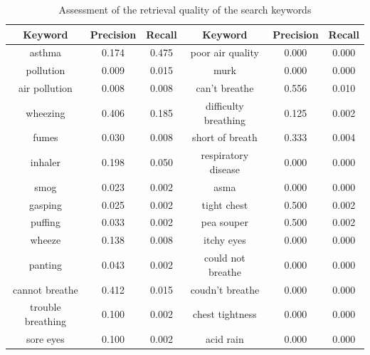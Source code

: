 \documentclass[10pt,letterpaper]{article}
\begin{document}
\begin{table}[ht!]
\centering
\begin{tabular}{ | c | c | c || c | c | c | }
  \hline
   \textbf{Keyword} & \textbf{Precision} & \textbf{Recall} & \textbf{Keyword} & \textbf{Precision} & \textbf{Recall}\\
  \hline
asthma & 0.174 & 0.475 & poor air quality & 0.000 & 0.000\\ 
\hline
pollution & 0.009 & 0.015 & murk & 0.000 & 0.000\\ 
\hline
air pollution & 0.008 & 0.008 & can't breathe & 0.556 & 0.010\\ 
\hline
wheezing & 0.406 & 0.185 & difficulty breathing & 0.125 & 0.002\\ 
\hline
fumes & 0.030 & 0.008 & short of breath & 0.333 & 0.004\\ 
\hline
inhaler & 0.198 & 0.050 & respiratory disease & 0.000 & 0.000\\ 
\hline
smog & 0.023 & 0.002 & asma & 0.000 & 0.000\\ 
\hline
gasping & 0.025 & 0.002 & tight chest & 0.500 & 0.002\\ 
\hline
puffing & 0.033 & 0.002 & pea souper & 0.500 & 0.002\\ 
\hline
wheeze & 0.138 & 0.008 & itchy eyes & 0.000 & 0.000\\ 
\hline
panting & 0.043 & 0.002 & could not breathe & 0.000 & 0.000\\ 
\hline
cannot breathe & 0.412 & 0.015 & coudn't breathe & 0.000 & 0.000\\ 
\hline
trouble breathing & 0.100 & 0.002 & chest tightness & 0.000 & 0.000\\ 
\hline
sore eyes & 0.100 & 0.002 & acid rain & 0.000 & 0.000\\ 
\hline
\end{tabular}
\caption{Assessment of the retrieval quality of the search keywords}
\label{table:9}
\end{table}
%
\end{document}
